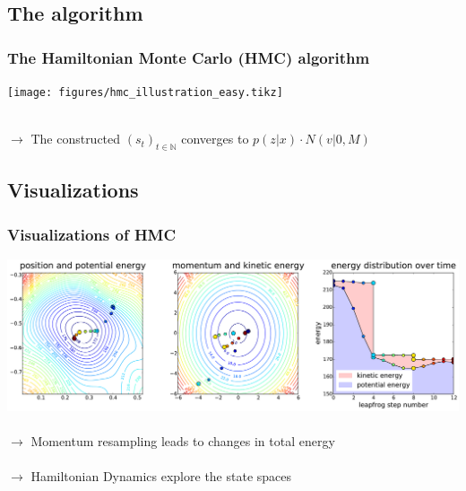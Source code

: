 \documentclass{beamer}
\begin{document}
	
	\subsection{The algorithm} 
	\begin{frame}
		\frametitle{The Hamiltonian Monte Carlo (HMC) algorithm}
		\centering		
		\texttt{[image: figures/hmc\_illustration\_easy.tikz]} %
		\\~\\
		\raggedright
		$\boldsymbol{\rightarrow}$ The constructed $(s_t)_{t \in \mathbb{N}}$ converges to $p(z|x) \cdot N(v|0, M)$ %
	\end{frame}	

	\subsection{Visualizations} 
	\begin{frame}
		\frametitle{Visualizations of HMC}
		\includegraphics[width=\textwidth]{figures/hmc_motion_3hmc_04lf_presi.pdf}
		\\~\\
		$\boldsymbol{\rightarrow}$ Momentum resampling leads to changes in total energy\\~\\
		$\boldsymbol{\rightarrow}$ Hamiltonian Dynamics explore the state spaces
	\end{frame}
	

\end{document}
